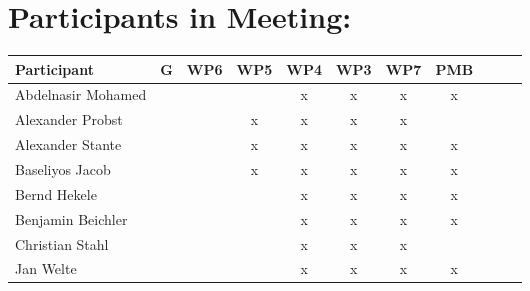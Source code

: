 \documentclass[a4paper, 11pt]{article}
\begin{document}
\section{Participants in Meeting:}

\begin{tabular}{|l|c|c|c|c||c|c|c||c|c|c|}
\hline
\textbf{Participant}  & \textbf{G} & \textbf{WP6} &  \textbf{WP5} & \textbf{WP4}&  \textbf{WP3} & \textbf{WP7}&  \textbf{PMB} \\\hline
Abdelnasir Mohamed    &   &   &  & x & x & x & x \\\hline 
Alexander Probst     &  &  & x & x & x & x &   \\\hline  
Alexander Stante     &   &   &  x  & x & x & x & x \\\hline 
Baseliyos Jacob      &   &   & x & x & x & x & x \\\hline 
Bernd Hekele         &   &   &  & x & x & x & x \\\hline
Benjamin Beichler    &   &   &   &  x &  x &  x & x  \\\hline
Christian Stahl      &   &   &  & x & x & x  &   \\\hline
Jan Welte            &   &  &  & x & x & x  & x  \\\hline

\end{tabular}
\end{document}
